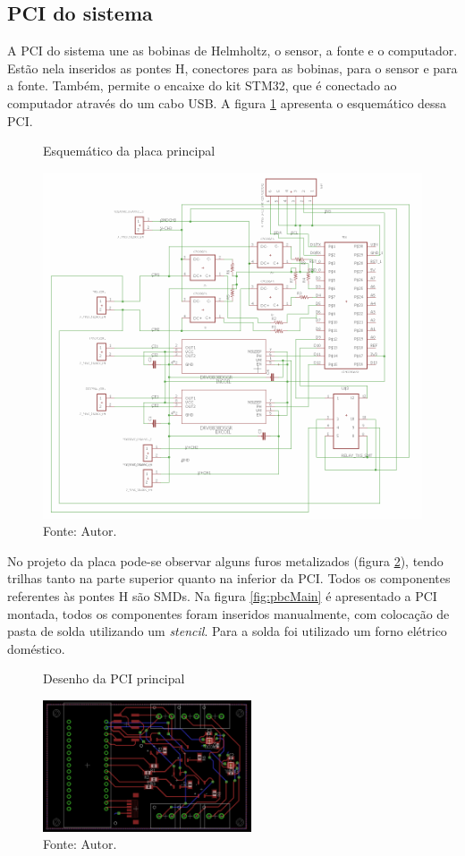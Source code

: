 \subsection{PCI do sistema}

A PCI do sistema une as bobinas de Helmholtz, o sensor, a fonte e o computador. Estão nela inseridos as pontes H, conectores para as bobinas, para o sensor e para a fonte. Também, permite o encaixe do kit STM32, que é conectado ao computador através do um cabo USB. A figura \ref{fig:esqMain} apresenta o esquemático dessa PCI.

\begin{figure}[H]
    \centering
     \caption{Esquemático da placa principal}
     \includegraphics[width=1\textwidth]{./img/PCBs/esquematicoMain.png}
     \caption*{Fonte: Autor.}\label{fig:esqMain}
\end{figure}

No projeto da placa pode-se observar alguns furos metalizados (figura \ref{fig:desMain}), tendo trilhas tanto na parte superior quanto na inferior da PCI. Todos os componentes referentes às pontes H são SMDs. Na figura \ref{fig:pbcMain} é apresentado a PCI montada, todos os componentes foram inseridos manualmente, com colocação de pasta de solda utilizando um \textit{stencil}. Para a solda foi utilizado um forno elétrico doméstico.

\begin{figure}[H]
    \centering
     \caption{Desenho da PCI principal}
     \includegraphics[width=0.55\textwidth]{./img/PCBs/desenhoMain.png}
     \caption*{Fonte: Autor.}\label{fig:desMain}
\end{figure}

